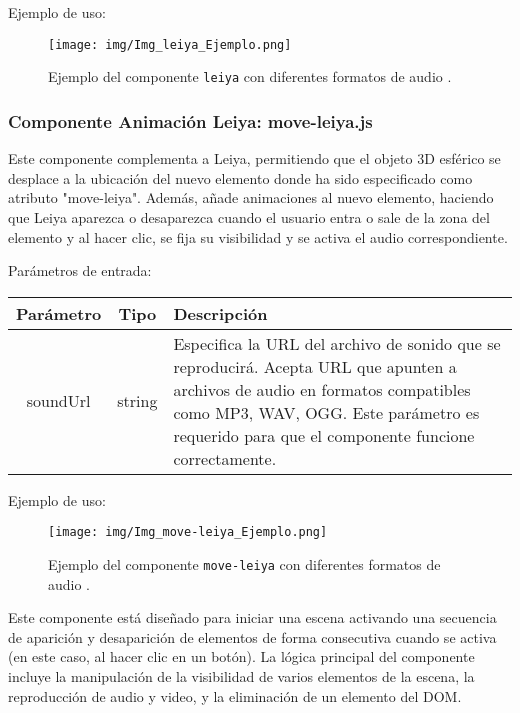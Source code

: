 \documentclass[a4paper, 12pt]{book}
\begin{document}
\vspace{1em} 
Ejemplo de uso:
\begin{figure}[H]
    \centering
\texttt{[image: img/Img\_leiya\_Ejemplo.png]}
    \caption{\footnotesize Ejemplo del componente \texttt{leiya} con diferentes formatos de audio
    .}
    \label{fig:Img_leiya_Ejemplo}
\end{figure}
\subsubsection*{Componente Animación Leiya: move-leiya.js}

Este componente complementa a Leiya, permitiendo que el objeto 3D esférico se desplace a la ubicación del nuevo elemento donde ha sido especificado como atributo "move-leiya". Además, añade animaciones al nuevo elemento, haciendo que Leiya aparezca o desaparezca cuando el usuario entra o sale de la zona del elemento y al hacer clic, se fija su visibilidad y se activa el audio correspondiente.

Parámetros de entrada:

\vspace{1em} 
\begin{tabular}{|c|c|p{10cm}|}
\hline
\textbf{Parámetro} & \textbf{Tipo} & \textbf{Descripción} \\

\hline
soundUrl & string & Especifica la URL del archivo de sonido que se reproducirá. Acepta URL que apunten a archivos de audio en formatos compatibles como MP3, WAV, OGG. Este parámetro es requerido para que el componente funcione correctamente. \\
\hline
\end{tabular}

\vspace{1em} 
Ejemplo de uso:
\begin{figure}[H]
    \centering
\texttt{[image: img/Img\_move-leiya\_Ejemplo.png]}
    \caption{\footnotesize Ejemplo del componente \texttt{move-leiya} con diferentes formatos de audio
    .}
    \label{fig:Img_move-leiya_Ejemplo}
\end{figure}

Este componente está diseñado para iniciar una escena activando una secuencia de aparición y desaparición de elementos de forma consecutiva cuando se activa (en este caso, al hacer clic en un botón). La lógica principal del componente incluye la manipulación de la visibilidad de varios elementos de la escena, la reproducción de audio y video, y la eliminación de un elemento del DOM.
\end{document}
